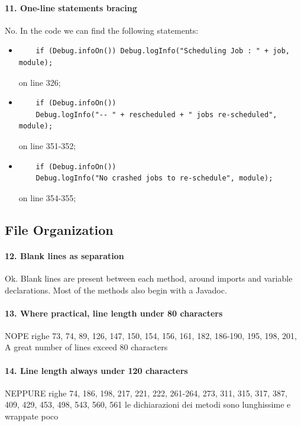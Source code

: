 \documentclass[english]{article}
\begin{document}
\paragraph{11. One-line statements bracing}
No.
In the code we can find the following statements:
\begin{itemize}
	\item 
	\begin{lstlisting} 
	if (Debug.infoOn()) Debug.logInfo("Scheduling Job : " + job, module); \end{lstlisting}
	 on line 326;
	\item 
	\begin{lstlisting} 
	if (Debug.infoOn())
    Debug.logInfo("-- " + rescheduled + " jobs re-scheduled", module); \end{lstlisting} 
    on line 351-352;
    \item 
    \begin{lstlisting} 
    if (Debug.infoOn())
    Debug.logInfo("No crashed jobs to re-schedule", module); \end{lstlisting}
     on line 354-355;
\end{itemize}

\subsection{File Organization}
\paragraph{12. Blank lines as separation}
Ok.
Blank lines are present between each method, around imports and variable declarations.
Most of the methods also begin with a Javadoc.

\paragraph{13. Where practical, line length under 80 characters}
NOPE
righe 73, 74, 89, 126, 147, 150, 154, 156, 161, 182, 186-190, 195, 198, 201, 
A great number of lines exceed 80 characters

\paragraph{14. Line length always under 120 characters}
NEPPURE
righe 74, 186, 198, 217, 221, 222, 261-264, 273, 311, 315, 317, 387, 409, 429, 453, 498, 543, 560, 561
le dichiarazioni dei metodi sono lunghissime e wrappate poco
\end{document}
